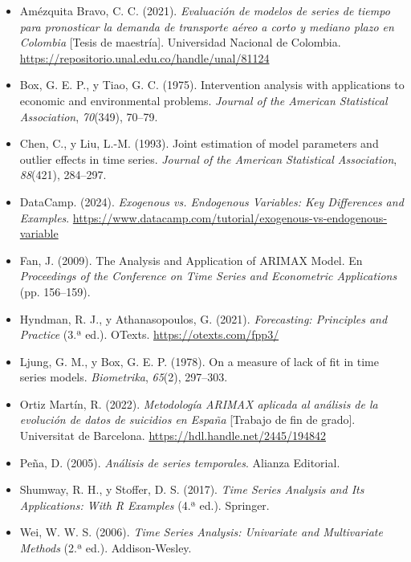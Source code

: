 \documentclass[11pt,letterpaper]{article}
\begin{document}
\begin{itemize}[label=\textbullet, leftmargin=1.5em, labelwidth=1em, labelsep=0.5em, itemsep=1.2em]
    \item Amézquita Bravo, C. C. (2021). \textit{Evaluación de modelos de series de tiempo para pronosticar la demanda de transporte aéreo a corto y mediano plazo en Colombia} [Tesis de maestría]. Universidad Nacional de Colombia. \url{https://repositorio.unal.edu.co/handle/unal/81124}
    
    \item Box, G. E. P., y Tiao, G. C. (1975). Intervention analysis with applications to economic and environmental problems. \textit{Journal of the American Statistical Association}, \textit{70}(349), 70--79.
    
    \item Chen, C., y Liu, L.-M. (1993). Joint estimation of model parameters and outlier effects in time series. \textit{Journal of the American Statistical Association}, \textit{88}(421), 284--297.
    
    \item DataCamp. (2024). \textit{Exogenous vs. Endogenous Variables: Key Differences and Examples}. \url{https://www.datacamp.com/tutorial/exogenous-vs-endogenous-variable}
    
    \item Fan, J. (2009). The Analysis and Application of ARIMAX Model. En \textit{Proceedings of the Conference on Time Series and Econometric Applications} (pp. 156--159).
    
    \item Hyndman, R. J., y Athanasopoulos, G. (2021). \textit{Forecasting: Principles and Practice} (3.ª ed.). OTexts. \url{https://otexts.com/fpp3/}
    
    \item Ljung, G. M., y Box, G. E. P. (1978). On a measure of lack of fit in time series models. \textit{Biometrika}, \textit{65}(2), 297--303.
    
    \item Ortiz Martín, R. (2022). \textit{Metodología ARIMAX aplicada al análisis de la evolución de datos de suicidios en España} [Trabajo de fin de grado]. Universitat de Barcelona. \url{https://hdl.handle.net/2445/194842}
    
    \item Peña, D. (2005). \textit{Análisis de series temporales}. Alianza Editorial.
    
    \item Shumway, R. H., y Stoffer, D. S. (2017). \textit{Time Series Analysis and Its Applications: With R Examples} (4.ª ed.). Springer.
    
    \item Wei, W. W. S. (2006). \textit{Time Series Analysis: Univariate and Multivariate Methods} (2.ª ed.). Addison-Wesley.
\end{itemize}
 
\end{document}
